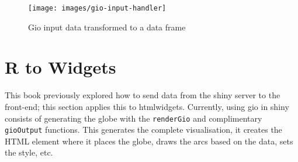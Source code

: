 \documentclass[10pt,]{krantz}
\makeatletter
\newenvironment{Shaded}{\begin{snugshade}}{\end{snugshade}}
\newcommand{\CommentTok}[1]{\textcolor[rgb]{0.37,0.37,0.37}{\textit{#1}}}
\newcommand{\ControlFlowTok}[1]{\textcolor[rgb]{0.27,0.27,0.27}{\textbf{#1}}}
\newcommand{\KeywordTok}[1]{\textcolor[rgb]{0.27,0.27,0.27}{\textbf{#1}}}
\newcommand{\NormalTok}[1]{#1}
\newcommand{\OperatorTok}[1]{\textcolor[rgb]{0.43,0.43,0.43}{\textbf{#1}}}
\newcommand{\StringTok}[1]{\textcolor[rgb]{0.5,0.5,0.5}{#1}}
\newenvironment{kframe}{%
\medskip{}
\setlength{\fboxsep}{.8em}
 \def\at@end@of@kframe{}%
 \ifinner\ifhmode%
  \def\at@end@of@kframe{\end{minipage}}%
  \begin{minipage}{\columnwidth}%
 \fi\fi%
 \def\FrameCommand##1{\hskip\@totalleftmargin \hskip-\fboxsep
 \colorbox{shadecolor}{##1}\hskip-\fboxsep
     \hskip-\linewidth \hskip-\@totalleftmargin \hskip\columnwidth}%
 \MakeFramed {\advance\hsize-\width
   \@totalleftmargin\z@ \linewidth\hsize
   \@setminipage}}%
 {\par\unskip\endMakeFramed%
 \at@end@of@kframe}
\renewenvironment{Shaded}{\begin{kframe}}{\end{kframe}}
\makeatother
\begin{document}
\begin{Shaded}
\end{Shaded}

\begin{figure}[H]

{\centering \texttt{[image: images/gio-input-handler]} 

}

\caption{Gio input data transformed to a data frame}\label{fig:gio-input-handler}
\end{figure}

\hypertarget{shiny-widgets-r-to-widgets}{%
\section{R to Widgets}\label{shiny-widgets-r-to-widgets}}

This book previously explored how to send data from the shiny server to the front-end; this section applies this to htmlwidgets. Currently, using gio in shiny consists of generating the globe with the \texttt{renderGio} and complimentary \texttt{gioOutput} functions. This generates the complete visualisation, it creates the HTML element where it places the globe, draws the arcs based on the data, sets the style, etc.
\end{document}
